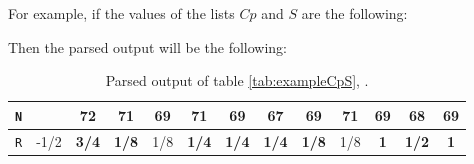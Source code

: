 For example, if the values of the lists $Cp$ and $S$ are the following:
\begin{table}[!h]
    \centering
    \caption{Example of $Cp$ and $S$, . Only the values in \textbf{bold} will be kept in the final solution.}
    \label{tab:exampleCpS}
\end{table}


Then the parsed output will be the following:
\begin{table}[!h]
    \centering
    \begin{tabular}{|c||cc|cccc|cccc|c|c|}
    \hline
    \texttt{N} &      & {\color[HTML]{3531FF} \textbf{72}}  & {\color[HTML]{9A0000} \textbf{71}}  & 69  & {\color[HTML]{9A0000} \textbf{71}}  & {\color[HTML]{9A0000} \textbf{69}}  & {\color[HTML]{9A0000} \textbf{67}}  & {\color[HTML]{9A0000} \textbf{69}}  & 71  & {\color[HTML]{3531FF} \textbf{69}} & {\color[HTML]{3531FF} \textbf{68}}  & \textbf{69} \\
    \hline
    \texttt{R} & -1/2 & {\color[HTML]{3531FF} \textbf{3/4}} & {\color[HTML]{9A0000} \textbf{1/8}} & 1/8 & {\color[HTML]{9A0000} \textbf{1/4}} & {\color[HTML]{9A0000} \textbf{1/4}} & {\color[HTML]{9A0000} \textbf{1/4}} & {\color[HTML]{9A0000} \textbf{1/8}} & 1/8 & {\color[HTML]{3531FF} \textbf{1}}  & {\color[HTML]{3531FF} \textbf{1/2}} & \textbf{1}  \\
    \hline
    \end{tabular}
    \caption{Parsed output of table \ref{tab:exampleCpS}, .}
    \label{tab:exampleNR}
\end{table}

